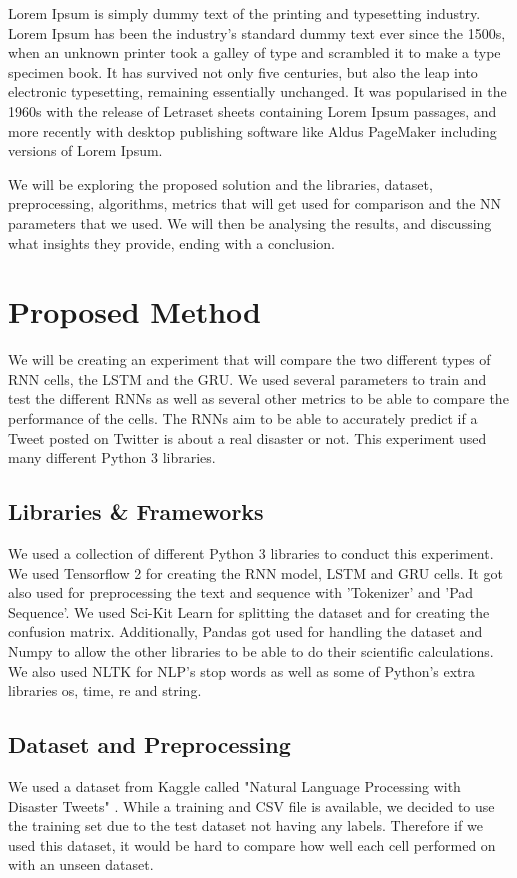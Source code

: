 \documentclass[a4paper,10pt]{article}
\begin{document}
	Lorem Ipsum is simply dummy text of the printing and typesetting industry. Lorem Ipsum has been the industry's standard dummy text ever since the 1500s, when an unknown printer took a galley of type and scrambled it to make a type specimen book. It has survived not only five centuries, but also the leap into electronic typesetting, remaining essentially unchanged. It was popularised in the 1960s with the release of Letraset sheets containing Lorem Ipsum passages, and more recently with desktop publishing software like Aldus PageMaker including versions of Lorem Ipsum.

	We will be exploring the proposed solution and the libraries, dataset, preprocessing, algorithms, metrics that will get used for comparison and the NN parameters that we used. We will then be analysing the results, and discussing what insights they provide, ending with a conclusion.


\section{Proposed Method}
	We will be creating an experiment that will compare the two different types of RNN cells, the LSTM and the GRU. We used several parameters to train and test the different RNNs as well as several other metrics to be able to compare the performance of the cells. The RNNs aim to be able to accurately predict if a Tweet posted on Twitter is about a real disaster or not. This experiment used many different Python 3 libraries.

\subsection{Libraries \& Frameworks}
	We used a collection of different Python 3 libraries to conduct this experiment. We used Tensorflow 2 \cite{tensorflow} for creating the RNN model, LSTM and GRU cells. It got also used for preprocessing the text and sequence with 'Tokenizer' and 'Pad Sequence'. We used Sci-Kit Learn \cite{scikit-learn} for splitting the dataset and for creating the confusion matrix. Additionally, Pandas \cite{} got used for handling the dataset and Numpy to allow the other libraries to be able to do their scientific calculations. We also used NLTK \cite{} for NLP's stop words as well as some of Python's extra libraries os, time, re and string. 

\subsection{Dataset and Preprocessing}
	We used a dataset from Kaggle called "Natural Language Processing with Disaster Tweets" \cite{disater_kaggle}. While a training and CSV file is available, we decided to use the training set due to the test dataset not having any labels. Therefore if we used this dataset, it would be hard to compare how well each cell performed on with an unseen dataset.
\end{document}
